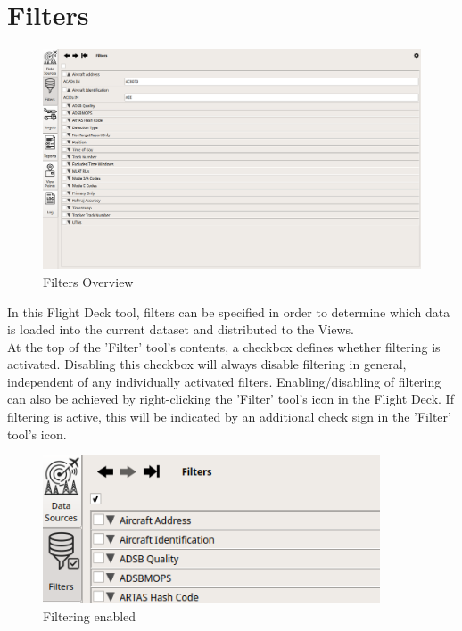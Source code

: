 
\section{Filters}
\label{sec:filters} 

\begin{figure}[H]
  \hspace*{-2.5cm}
  \includegraphics[width=19cm,frame]{figures/ui_filters.png}
\caption{Filters Overview}
\end{figure}

In this Flight Deck tool, filters can be specified in order to determine which data is loaded into the current dataset and distributed to the Views. \\

At the top of the 'Filter' tool's contents, a checkbox defines whether filtering is activated. Disabling this checkbox will always disable filtering in general, 
independent of any individually activated filters. Enabling/disabling of filtering can also be achieved by right-clicking the 'Filter' tool's icon in the Flight Deck.
If filtering is active, this will be indicated by an additional check sign in the 'Filter' tool's icon. \\

\begin{figure}[H]
  \center
    \includegraphics[width=10cm,frame]{figures/filter_active.png}
  \caption{Filtering enabled}
\end{figure}

